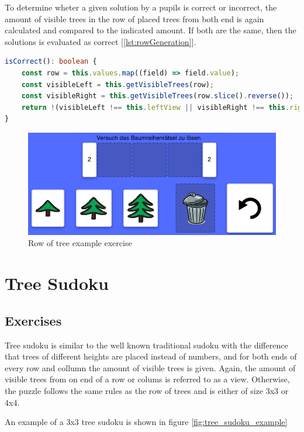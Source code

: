 To determine wheter a given solution by a pupils is correct or incorrect, the amount of visible trees in the row of placed trees from both end is again calculated and compared to the indicated amount. If both are the same, then the solutions is evaluated as correct [\ref{lst:rowGeneration}].

\begin{lstlisting}[language=TypeScript,caption={Correctness check of a row of tree exercise solution},label={lst:rowCorrectness}]
isCorrect(): boolean {
    const row = this.values.map((field) => field.value);
    const visibleLeft = this.getVisibleTrees(row);
    const visibleRight = this.getVisibleTrees(row.slice().reverse());
    return !(visibleLeft !== this.leftView || visibleRight !== this.rightView);
}
\end{lstlisting}

\begin{figure} 
    \centering
    \includegraphics[width=0.4 \columnwidth]{figures/tree_row_example_exercise.png}
    \caption{Row of tree example exercise} 
    \label{fig:tree_row_example} 
\end{figure}

\section{Tree Sudoku}
\label{section:treeSudoku}

\subsection{Exercises}
Tree sudoku is similar to the well known traditional sudoku with the difference that trees of different heights are placed instead of numbers, and for both ends of every row and collumn the amount of visible trees is given. Again, the amount of visible trees from on end of a row or colums is referred to as a view. Otherwise, the puzzle follows the same rules as the row of trees and is either of size 3x3 or 4x4.

\begin{example}
    An example of a 3x3 tree sudoku is shown in figure \ref{fig:tree_sudoku_example}
\end{example}

